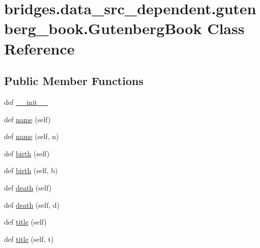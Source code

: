 \hypertarget{classbridges_1_1data__src__dependent_1_1gutenberg__book_1_1_gutenberg_book}{}\section{bridges.\+data\+\_\+src\+\_\+dependent.\+gutenberg\+\_\+book.\+Gutenberg\+Book Class Reference}
\label{classbridges_1_1data__src__dependent_1_1gutenberg__book_1_1_gutenberg_book}
\subsection*{Public Member Functions}
\begin{DoxyCompactItemize}
\item 
def \hyperlink{classbridges_1_1data__src__dependent_1_1gutenberg__book_1_1_gutenberg_book_ac44f922d6f63fc6ab3c0788ea9b9c4b5}{\+\_\+\+\_\+init\+\_\+\+\_\+}
\item 
def \hyperlink{classbridges_1_1data__src__dependent_1_1gutenberg__book_1_1_gutenberg_book_a8b7e11a07b7227b7798e6c461f0e3e88}{name} (self)
\item 
def \hyperlink{classbridges_1_1data__src__dependent_1_1gutenberg__book_1_1_gutenberg_book_aa3aefe0ebdc4d09c1011399b52808e62}{name} (self, n)
\item 
def \hyperlink{classbridges_1_1data__src__dependent_1_1gutenberg__book_1_1_gutenberg_book_a4f3d3453a3cd9702174d74c916018fbd}{birth} (self)
\item 
def \hyperlink{classbridges_1_1data__src__dependent_1_1gutenberg__book_1_1_gutenberg_book_a228d27a028d1abff133807d372da5b82}{birth} (self, b)
\item 
def \hyperlink{classbridges_1_1data__src__dependent_1_1gutenberg__book_1_1_gutenberg_book_a2ad2399a95ded7f560fcb3a5293faf5d}{death} (self)
\item 
def \hyperlink{classbridges_1_1data__src__dependent_1_1gutenberg__book_1_1_gutenberg_book_aaa05c897d2d38783236362e76dfbcb41}{death} (self, d)
\item 
def \hyperlink{classbridges_1_1data__src__dependent_1_1gutenberg__book_1_1_gutenberg_book_aa26adb962fe01a2661f350fab167a144}{title} (self)
\item 
def \hyperlink{classbridges_1_1data__src__dependent_1_1gutenberg__book_1_1_gutenberg_book_abc4d2b106849f50e0132a604c8874f0d}{title} (self, t)
\item 

\end{DoxyCompactItemize}
